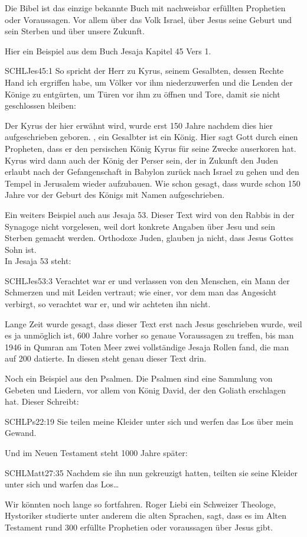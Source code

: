 \documentclass[fontsize=16pt]{mybib}
\begin{document}
\begin{otsblock}
    Die Bibel ist das einzige bekannte Buch mit nachweisbar erfüllten Prophetien oder Voraussagen. Vor allem über das Volk Israel, über Jesus seine Geburt und sein Sterben und über unsere Zukunft.

Hier ein Beispiel aus dem Buch Jesaja Kapitel 45 Vers 1.
\begin{bibelbox}{SCHL}{Jes}{45:1}
So spricht der Herr zu Kyrus, seinem Gesalbten, dessen Rechte Hand ich ergriffen habe, um Völker vor ihm niederzuwerfen und die Lenden der Könige zu entgürten, um Türen vor ihm zu öffnen und Tore, damit sie nicht geschlossen bleiben:
\end{bibelbox}
Der Kyrus der hier erwähnt wird, wurde erst 150 Jahre nachdem dies hier aufgeschrieben geboren. , ein Gesalbter ist ein König. Hier sagt Gott durch einen Propheten, dass er den persischen König Kyrus für seine Zwecke auserkoren hat. Kyrus wird dann auch der König der Perser sein, der in Zukunft den Juden erlaubt nach der Gefangenschaft in Babylon zurück nach Israel zu gehen und den Tempel in Jerusalem wieder aufzubauen. Wie schon gesagt, dass wurde schon 150 Jahre vor der Geburt des Königs mit Namen aufgeschrieben.

Ein weiters Beispiel auch aus Jesaja 53. Dieser Text wird von den Rabbis in der Synagoge nicht vorgelesen, weil dort konkrete Angaben über Jesu und sein Sterben gemacht werden. Orthodoxe Juden, glauben ja nicht, dass Jesus Gottes Sohn ist.\\
In Jesaja 53 steht:
\begin{bibelbox}{SCHL}{Jes}{53:3}
Verachtet war er und verlassen von den Menschen, ein Mann der Schmerzen und mit Leiden vertraut; wie einer, vor dem man das Angesicht verbirgt, so verachtet war er, und wir achteten ihn nicht.
\end{bibelbox}
Lange Zeit wurde gesagt, dass dieser Text erst nach Jesus geschrieben wurde, weil es ja unmöglich ist, 600 Jahre vorher so genaue Voraussagen zu treffen, bis man 1946 in Qumran am Toten Meer zwei vollständige Jesaja Rollen fand, die man auf 200 \vChr{} datierte. In diesen steht genau dieser Text drin.

Noch ein Beispiel aus den Psalmen. Die Psalmen sind eine Sammlung von Gebeten und Liedern, vor allem von König David, der den Goliath erschlagen hat. Dieser Schreibt:
\begin{bibelbox}{SCHL}{Ps}{22:19}
Sie teilen meine Kleider unter sich und werfen das Los über mein Gewand.
\end{bibelbox}
Und im Neuen Testament steht 1000 Jahre später:
\begin{bibelbox}{SCHL}{Matt}{27:35}
Nachdem sie ihn nun gekreuzigt hatten, teilten sie seine Kleider unter sich und warfen das Los\dots
\end{bibelbox}

Wir könnten noch lange so fortfahren. Roger Liebi ein Schweizer Theologe, Hystoriker studierte unter anderem die alten Sprachen, sagt, dass es im Alten Testament rund 300 erfüllte Prophetien oder voraussagen über Jesus gibt.
\end{otsblock}
\end{document}
